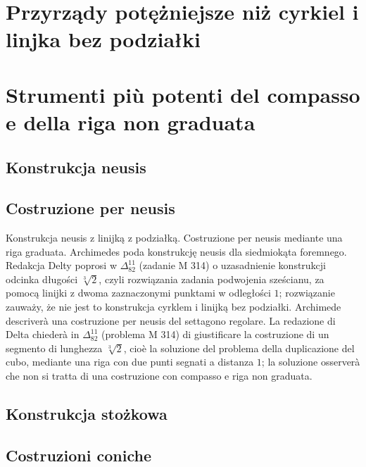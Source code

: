 
%

\section{Przyrządy potężniejsze niż cyrkiel i linjka bez podziałki} %
\section{Strumenti più potenti del compasso e della riga non graduata} %

\subsection{Konstrukcja neusis} %
\subsection{Costruzione per neusis} %

Konstrukcja neusis z linijką z podziałką. %
Costruzione per neusis mediante una riga graduata. %
Archimedes poda konstrukcję neusis dla siedmiokąta foremnego. %
Redakcja Delty poprosi w $\Delta_{82}^{11}$ (zadanie M 314) o uzasadnienie konstrukcji odcinka długości $\sqrt[3]{2}$, czyli rozwiązania zadania podwojenia sześcianu, za pomocą linijki z dwoma zaznaczonymi punktami w odległości $1$; rozwiązanie zauważy, że nie jest to konstrukcja cyrklem i linijką bez podziałki. %
Archimede descriverà una costruzione per neusis del settagono regolare. %
La redazione di Delta chiederà in $\Delta_{82}^{11}$ (problema M 314) di giustificare la costruzione di un segmento di lunghezza $\sqrt[3]{2}$, cioè la soluzione del problema della duplicazione del cubo, mediante una riga con due punti segnati a distanza $1$; la soluzione osserverà che non si tratta di una costruzione con compasso e riga non graduata. %

\subsection{Konstrukcja stożkowa} %
\subsection{Costruzioni coniche} %

